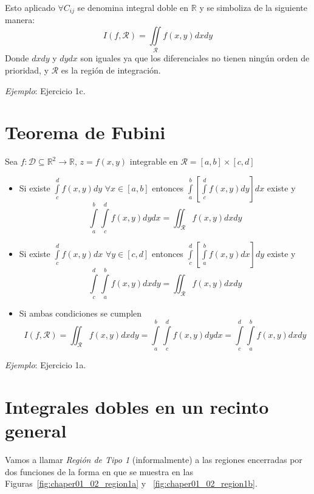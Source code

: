 Esto aplicado $\forall C_{ij}$ se denomina integral doble en $\mathbb{R}$ y se simboliza de la siguiente manera:
$$
I(f,\mathcal{R}) = \iint\limits_{\mathcal{R}}f(x,y)dxdy
$$
Donde $dxdy$ y $dydx$ son iguales ya que los diferenciales no tienen ning\'un orden de prioridad, y $\mathcal{R}$ es la regi\'on de integraci\'on.

\emph{Ejemplo}: Ejercicio 1c.

\section{Teorema de Fubini}

\begin{theorem}

Sea $f:\mathcal{D} \subseteq \mathbb{R}^2 \rightarrow \mathbb{R}$, $z=f(x,y)$ integrable en $\mathcal{R}=\left[a,b\right]\times\left[c,d\right]$
\begin{itemize}

\item Si existe $\int\limits_c^d f(x,y)dy$ $\forall x \in \left[a,b\right]$ entonces $\int\limits_a^b \left[ \int\limits_c^d f(x,y)dy \right] dx$ existe y
$$
\int\limits_a^b \int\limits_c^d f(x,y)dydx =
\iint_{\mathcal{R}}f(x,y)dxdy
$$

\item Si existe $\int\limits_c^d f(x,y)dx$ $\forall y \in \left[c,d\right]$ entonces $\int\limits_c^d \left[ \int\limits_a^b f(x,y)dx \right] dy$ existe y
$$
\int\limits_c^d \int\limits_a^b f(x,y)dxdy =
\iint_{\mathcal{R}}f(x,y)dxdy
$$

\item Si ambas condiciones se cumplen
$$
I(f, \mathcal{R}) = \iint_{\mathcal{R}}f(x,y)dxdy =
\int\limits_a^b \int\limits_c^d f(x,y)dydx =
\int\limits_c^d \int\limits_a^b f(x,y)dxdy
$$

\end{itemize}

\end{theorem}

\emph{Ejemplo}: Ejercicio 1a.

\section{Integrales dobles en un recinto general}

Vamos a llamar \emph{Regi\'on de Tipo 1} (informalmente) a las regiones encerradas por dos funciones de la forma en que se muestra en las Figuras~\ref{fig:chaper01_02_region1a} y ~\ref{fig:chaper01_02_region1b}.

